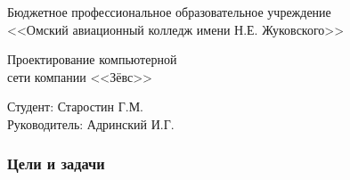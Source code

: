 \documentclass[aspectratio=169]{beamer}
\author{Старостин Г.М.}
\begin{document}
	
\begin{frame}
	\centering
	 \begin{center}
		Бюджетное профессиональное образовательное учреждение\\
		<<Омский авиационный колледж имени Н.Е. Жуковского>>
	 \end{center}
	 
	 \vspace{1cm}
	 
	 \parbox{0.8\textwidth}{ 
	 	\fontsize{18}{19}\selectfont
	 	\centering
	 	Проектирование компьютерной\\
	 	сети компании <<Зёвс>>
	 }
	 \vspace{2cm}
	 \begin{flushleft}
	 	Студент: Старостин Г.М. \\
	 	Руководитель: Адринский И.Г.
	 \end{flushleft}
	 \vspace{0.5cm}
\end{frame}
	
\begin{frame}
	\frametitle{Цели и задачи}
	\
\end{frame}
	
\end{document}
